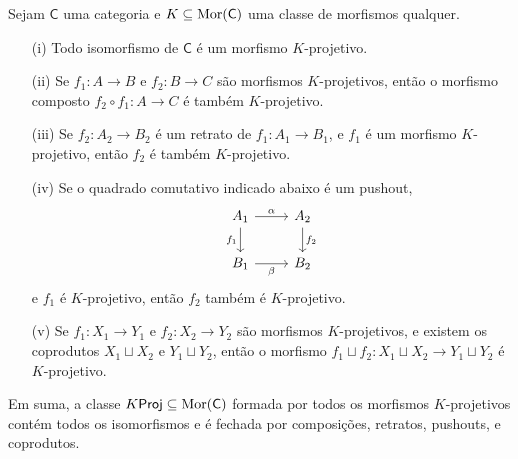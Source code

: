 \begin{prop}\label{prop:props_morfismos_proj}
  Sejam $\mathsf{C}$ uma categoria e $K \subseteq \mathrm{Mor}(\mathsf{C})$ uma classe de morfismos qualquer.
  \begin{enumerate}
    \item[(i)] Todo isomorfismo de $\mathsf{C}$ é um morfismo $K$-projetivo.
    
    \item[(ii)] Se $f_1: A \to B$ e $f_2: B \to C$ são morfismos $K$-projetivos, então o morfismo composto $f_2 \circ f_1: A \to C$ é também $K$-projetivo.

    \item[(iii)] Se $f_2: A_2 \to B_2$ é um retrato de $f_1: A_1 \to B_1$, e $f_1$ é um morfismo $K$-projetivo, então $f_2$ é também $K$-projetivo.
    
    \item[(iv)] Se o quadrado comutativo indicado abaixo é um pushout,
    \begin{displaymath}
      \begin{tikzcd}
        A_1
        \arrow[r, "\alpha"]
        \arrow[d, "f_1" swap]
        & A_2
        \arrow[d, "f_2"]
        \\ B_1
        \arrow[r, "\beta" swap]
        & B_2
      \end{tikzcd}
    \end{displaymath}
    e $f_1$ é $K$-projetivo, então $f_2$ também é $K$-projetivo.

    \item[(v)] Se $f_1: X_1 \to Y_1$ e $f_2: X_2 \to Y_2$ são morfismos $K$-projetivos, e existem os coprodutos $X_1 \sqcup X_2$ e $Y_1 \sqcup Y_2$, então o morfismo $f_1 \sqcup f_2: X_1 \sqcup X_2 \to Y_1 \sqcup Y_2$ é $K$-projetivo.
  \end{enumerate}
  Em suma, a classe $K\mathsf{Proj} \subseteq \mathrm{Mor}(\mathsf{C})$ formada por todos os morfismos $K$-projetivos contém todos os isomorfismos e é fechada por composições, retratos, pushouts, e coprodutos.
\end{prop}

